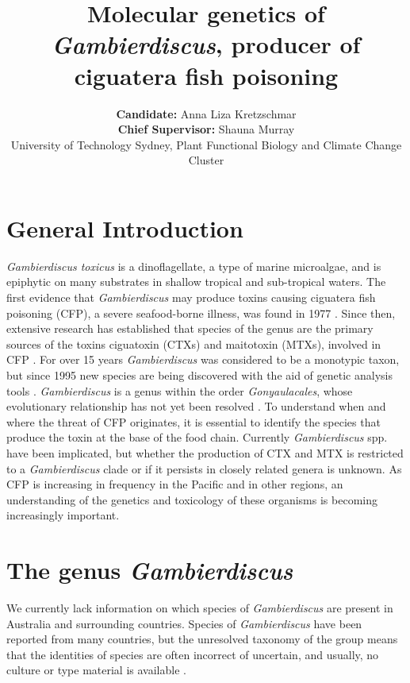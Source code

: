 \documentclass[12pt]{article}
\title{\textbf{Molecular genetics of \emph{Gambierdiscus}, producer of ciguatera fish poisoning}}
\author{\textbf{Candidate:} Anna Liza Kretzschmar\\
 \textbf{Chief Supervisor:} Shauna Murray\\
 {\small University of Technology Sydney, Plant Functional Biology and Climate Change Cluster}}
\date{}
\begin{document}
\maketitle

\section{General Introduction}
\emph{Gambierdiscus toxicus} is a dinoflagellate, a type of marine microalgae, and is epiphytic on many substrates in shallow tropical and sub-tropical waters. The first evidence that \emph{Gambierdiscus} may produce toxins causing ciguatera fish poisoning (CFP), a severe seafood-borne illness, was found in 1977 \cite{yasumoto1977finding}.  
Since then, extensive research has established that species of the genus are the primary sources of the toxins ciguatoxin (CTXs) and maitotoxin (MTXs), involved in CFP \cite{chinain1997intraspecific,holmes1998gambierdiscus}.  
For over 15 years \emph{Gambierdiscus} was considered to be a monotypic taxon, but since 1995 new species are being discovered with the aid of genetic analysis tools \cite{faust1995observation,holmes1998gambierdiscus,litaker2009taxonomy,chinain1999morphology,fraga2011gambierdiscus,nishimura2014morphology}. \emph{Gambierdiscus} is a genus within the order \emph{Gonyaulacales}, whose evolutionary relationship has not yet been resolved \cite{gentekaki2014large}. To understand when and where the threat of CFP originates, it is essential to identify the species that produce the toxin at the base of the food chain. Currently \emph{Gambierdiscus} spp. have been implicated, but whether the production of CTX and MTX is restricted to a \emph{Gambierdiscus} clade or if it  persists in closely related genera is unknown.
As CFP is increasing in frequency in the Pacific \cite{skinner2011ciguatera} and in other regions, an understanding of the genetics and toxicology of these organisms is becoming increasingly important. 

\section{The genus \emph{Gambierdiscus}}
We currently lack information on which species of \emph{Gambierdiscus} are present in Australia and surrounding countries. Species of \emph{Gambierdiscus} have been reported from many countries, but the unresolved taxonomy of the group means that the identities of species are often incorrect of uncertain, and usually, no culture or type material is available \cite{marine2014}.
\end{document}
